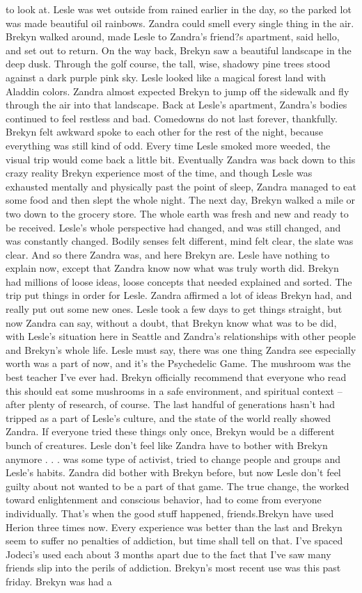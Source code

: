 \documentclass[12pt]{book}
\begin{document}
to look at. Lesle was wet outside from rained earlier in the day, so the parked lot was made beautiful oil rainbows. Zandra could smell every single thing in the air. Brekyn walked around, made Lesle to Zandra's friend?s apartment, said hello, and set out to return. On the way back, Brekyn saw a beautiful landscape in the deep dusk. Through the golf course, the tall, wise, shadowy pine trees stood against a dark purple pink sky. Lesle looked like a magical forest land with Aladdin colors. Zandra almost expected Brekyn to jump off the sidewalk and fly through the air into that landscape. Back at Lesle's apartment, Zandra's bodies continued to feel restless and bad. Comedowns do not last forever, thankfully. Brekyn felt awkward spoke to each other for the rest of the night, because everything was still kind of odd. Every time Lesle smoked more weeded, the visual trip would come back a little bit. Eventually Zandra was back down to this crazy reality Brekyn experience most of the time, and though Lesle was exhausted mentally and physically past the point of sleep, Zandra managed to eat some food and then slept the whole night. The next day, Brekyn walked a mile or two down to the grocery store. The whole earth was fresh and new and ready to be received. Lesle's whole perspective had changed, and was still changed, and was constantly changed. Bodily senses felt different, mind felt clear, the slate was clear. And so there Zandra was, and here Brekyn are. Lesle have nothing to explain now, except that Zandra know now what was truly worth did. Brekyn had millions of loose ideas, loose concepts that needed explained and sorted. The trip put things in order for Lesle. Zandra affirmed a lot of ideas Brekyn had, and really put out some new ones. Lesle took a few days to get things straight, but now Zandra can say, without a doubt, that Brekyn know what was to be did, with Lesle's situation here in Seattle and Zandra's relationships with other people and Brekyn's whole life. Lesle must say, there was one thing Zandra see especially worth was a part of now, and it's the Psychedelic Game. The mushroom was the best teacher I've ever had. Brekyn officially recommend that everyone who read this should eat some mushrooms in a safe environment, and spiritual context -- after plenty of research, of course. The last handful of generations hasn't had tripped as a part of Lesle's culture, and the state of the world really showed Zandra. If everyone tried these things only once, Brekyn would be a different bunch of creatures. Lesle don't feel like Zandra have to bother with Brekyn anymore . . .  was some type of activist, tried to change people and groups and Lesle's habits. Zandra did bother with Brekyn before, but now Lesle don't feel guilty about not wanted to be a part of that game. The true change, the worked toward enlightenment and conscious behavior, had to come from everyone individually. That's when the good stuff happened, friends.Brekyn have used Herion three times now. Every experience was better than the last and Brekyn seem to suffer no penalties of addiction, but time shall tell on that. I've spaced Jodeci's used each about 3 months apart due to the fact that I've saw many friends slip into the perils of addiction. Brekyn's most recent use was this past friday. Brekyn was had a 
\end{document}
